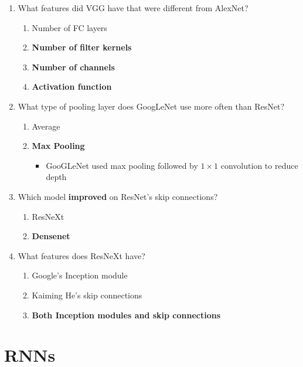 \documentclass{report}
\numberwithin{equation}{section}
\begin{document}
\begin{enumerate}
    \item What features did VGG have that were different from AlexNet?
    \begin{enumerate}[label=\alph*.]
        \item Number of FC layers
        \item \textbf{Number of filter kernels}
        \item \textbf{Number of channels}
        \item \textbf{Activation function}
    \end{enumerate}
    \item What type of pooling layer does GoogLeNet use more often than ResNet?
    \begin{enumerate}[label=\alph*.]
        \item Average
        \item \textbf{Max Pooling}
        \begin{itemize}
            \item GooGLeNet used max pooling followed by $1\times 1$ convolution to reduce depth
        \end{itemize}
    \end{enumerate}
    \item Which model \textbf{improved} on ResNet's skip connections?
    \begin{enumerate}[label=\alph*.]
        \item ResNeXt
        \item \textbf{Densenet}
    \end{enumerate}
    \item What features does ResNeXt have?
    \begin{enumerate}[label=\alph*.]
        \item Google's Inception module
        \item Kaiming He's skip connections
        \item \textbf{Both Inception modules and skip connections}
    \end{enumerate}
    
\end{enumerate}

\section{RNNs}
\end{document}
